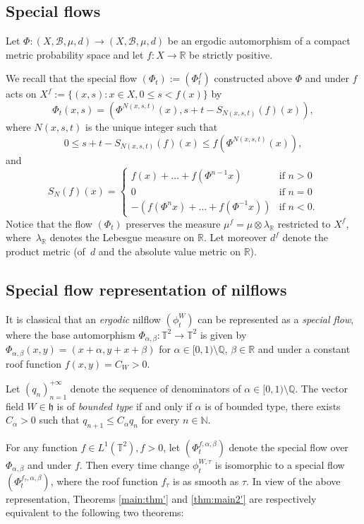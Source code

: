 \documentclass[10pt]{amsart}
\let\mathcal\mathscr
\newcounter{case}
\theoremstyle{definition}
\theoremstyle{plain}
\newcommand\NN{\mathbb{N}}
\newcommand\QQ{\mathbb{Q}}
\newcommand\RR{\mathbb{R}}
\newcommand\TT{\mathbb{T}}
\newcommand\cB{\mathcal{B}}
\begin{document}
\subsection{Special flows}
Let $\Phi:(X, \cB, \mu,d)\to (X,\cB,\mu,d)$ be an ergodic automorphism of a compact metric probability space and let $f:X\to \RR$ be strictly positive.

We recall that the special flow $(\Phi_t):=(\Phi_t^{f})$ constructed above $\Phi$ and under $f$ acts on $X^f:=\{(x,s): x\in X, 0\leq s<f(x)\}$ by
\[
\Phi_t(x,s)=(\Phi^{N(x,s,t)}(x),s+t-S_{N(x,s,t)}(f)(x)),
\]
where $N(x,s,t)$ is the unique integer such that
\begin{equation*}
\label{D-C}
0 \leq s+t- S_{N(x,s,t)}(f) (x) \leq f(\Phi^{N(x,s,t)}(x)),
\end{equation*}
and
\[
S_{N}(f) (x)=\begin{cases}
f(x)+\ldots+f(\Phi^{n-1}x) &\mbox{if } n>0\\
0&\mbox{if } n=0\\
-(f(\Phi^nx)+\ldots+f(\Phi^{-1}x))&\mbox{if } n<0.
\end{cases}
\]
Notice that the flow $(\Phi_t)$ preserves the measure $\mu^f=\mu\otimes \lambda_\RR$ restricted to $X^f$, where~$\lambda_\RR$ denotes the Lebesgue
measure on $\RR$. Let moreover $d^f$ denote the product metric (of~$d$ and the absolute value metric on $\RR$).

\subsection{Special flow representation of nilflows}\label{sec.Heis}
It is classical that an \emph{ergodic} nilflow $(\phi_t^W)$ can be represented as a \emph{special flow}, where the base automorphism $\Phi_{\alpha,\beta}:\TT^2\to \TT^2$ is given by $\Phi_{\alpha,\beta}(x,y)=(x+\alpha,y+x+\beta)$ for $\alpha\in [0,1)\setminus \QQ$, $\beta\in \RR$ and under a constant roof function $f(x,y)=C_W>0$.

Let $(q_n)_{n=1}^{+\infty}$ denote the sequence of denominators of $\alpha\in [0,1)\setminus \QQ$. The vector field $W\in \mathfrak h$ is of \emph{bounded type} if and only if $\alpha$ is of bounded type, \ie there exists $C_\alpha>0$ such that $q_{n+1}\leq C_\alpha q_n$ for every $n\in \NN$.

For any function $f\in L^1(\TT^2), f>0$, let $(\Phi_t^{f,\alpha, \beta})$ denote the special flow over $\Phi_{\alpha, \beta}$ and under $f$. Then every time change $\phi_t^{W,\tau}$ is isomorphic to a special flow $(\Phi_t^{f_{\tau},\alpha,\beta})$, where the roof function $f_\tau$ is as smooth as $\tau$. In view of the above representation, Theorems \ref{main:thm'} and \ref{thm:main2'} are respectively equivalent to the following two theorems:
\end{document}
